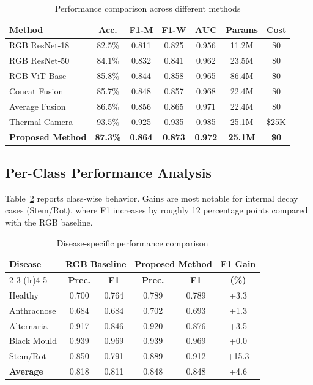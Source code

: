 \documentclass[conference]{IEEEtran}
\begin{document}
\begin{table}[!t]
    \caption{Performance comparison across different methods}
    \label{tab:performance}
    \raggedright
    \scriptsize
    \begin{tabular}{lcccccc}
        \toprule
        \textbf{Method} & \textbf{Acc.} & \textbf{F1-M} & \textbf{F1-W} & \textbf{AUC} & \textbf{Params} & \textbf{Cost} \\
        \midrule
        RGB ResNet-18 & 82.5\% & 0.811 & 0.825 & 0.956 & 11.2M & \$0 \\
        RGB ResNet-50 & 84.1\% & 0.832 & 0.841 & 0.962 & 23.5M & \$0 \\
        RGB ViT-Base & 85.8\% & 0.844 & 0.858 & 0.965 & 86.4M & \$0 \\
        Concat Fusion & 85.7\% & 0.848 & 0.857 & 0.968 & 22.4M & \$0 \\
        Average Fusion & 86.5\% & 0.856 & 0.865 & 0.971 & 22.4M & \$0 \\
        Thermal Camera & 93.5\% & 0.925 & 0.935 & 0.985 & 25.1M & \$25K \\
        \rowcolor{green!20}
        \textbf{Proposed Method} & \textbf{87.3\%} & \textbf{0.864} & \textbf{0.873} & \textbf{0.972} & \textbf{25.1M} & \textbf{\$0} \\
        \bottomrule
    \end{tabular}
\end{table}

\subsection{Per-Class Performance Analysis}
Table~\ref{tab:perclass} reports class-wise behavior. Gains are most notable for internal decay cases (Stem/Rot), where F1 increases by roughly 12 percentage points compared with the RGB baseline.

\begin{table}[!t]
    \caption{Disease-specific performance comparison}
    \label{tab:perclass}
    \raggedright
    \scriptsize
    \begin{tabular}{lccccc}
        \toprule
        \multirow{2}{*}{\textbf{Disease}} & \multicolumn{2}{c}{\textbf{RGB Baseline}} & \multicolumn{2}{c}{\textbf{Proposed Method}} & \textbf{F1 Gain} \\
        \cmidrule(lr){2-3} \cmidrule(lr){4-5}
         & \textbf{Prec.} & \textbf{F1} & \textbf{Prec.} & \textbf{F1} & \textbf{(\%)} \\
        \midrule
        Healthy & 0.700 & 0.764 & 0.789 & 0.789 & +3.3 \\
        Anthracnose & 0.684 & 0.684 & 0.702 & 0.693 & +1.3 \\
        Alternaria & 0.917 & 0.846 & 0.920 & 0.876 & +3.5 \\
        Black Mould & 0.939 & 0.969 & 0.939 & 0.969 & +0.0 \\
        Stem/Rot & 0.850 & 0.791 & 0.889 & 0.912 & +15.3 \\
        \midrule
        \textbf{Average} & 0.818 & 0.811 & 0.848 & 0.848 & +4.6 \\
        \bottomrule
    \end{tabular}
\end{table}
\end{document}
